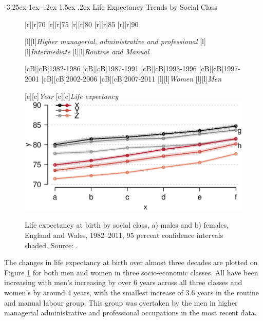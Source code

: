 \documentclass[11 pt, a4paper]{report}
\makeatletter
\renewcommand\subsection{\@startsection{subsection}{2}{\z@}%
                                     {-3.25ex\@plus -1ex \@minus -.2ex}%
                                     {1.5ex \@plus .2ex}%
    								{\large\scshape}}
\makeatother
\begin{document}
\clearpage

\subsection{Life Expectancy Trends by Social Class}

\begin{figure}[hbtp!]
[r][r]{\small{70}}
[r][r]{\small{75}}
[r][r]{\small{80}}
[r][r]{\small{85}}
[r][r]{\small{90}}

[l][l]{\small{\emph{Higher managerial, administrative and professional}}}
[l][l]{\small{\emph{Intermediate}}}
[l][l]{\small{\emph{Routine and Manual}}}

[cB][cB]{\small{1982-1986}}
[cB][cB]{\small{1987-1991}}
[cB][cB]{\small{1993-1996}}
[cB][cB]{\small{1997-2001}}
[cB][cB]{\small{2002-2006}}
[cB][cB]{\small{2007-2011}}
[l][l]{\small{\emph{Women}}}
[l][l]{\small{\emph{Men}}}

[c][c]{\small{\emph{Year}}}
[c][c]{\small{\emph{Life expectancy}}}
\includegraphics[width=\textwidth]{../figures/Fig8.6.eps}
\caption{Life expectancy at birth by social class, a) males and b) females, England and Wales, 1982–2011, 95 percent confidence intervals shaded. Source: \citet{ONS2015c}.}\label{Fig:N06} %
\end{figure}

The changes in life expectancy at birth over almost three decades are plotted on Figure \ref{Fig:N06} for both men and women in three socio-economic classes. All have been increasing with men's increasing by over 6 years across all three classes and women's by around 4 years, with the smallest increase of 3.6 years in the routine and manual labour group. This group was overtaken by the men in higher managerial administrative and professional occupations in the most recent data. 
\end{document}
